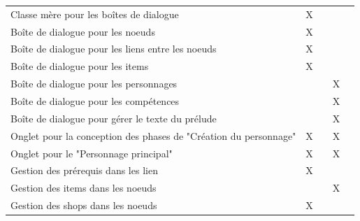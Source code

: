 \begin{centering}
\begin{longtable}{|p{8cm}|c|c|c|c|}
				\rowcolor{lightgray} \multicolumn{5}{|c|}{ \textbf{Boîtes de dialogue}}\\
				\hline
				Classe mère pour les boîtes de dialogue & X & & &\\
				\hline
				Boîte de dialogue pour les noeuds & X & & & \\
				\hline
				Boîte de dialogue pour les liens entre les noeuds & X & & & \\
				\hline
				Boîte de dialogue pour les items & X & & & \\
				\hline
				Boîte de dialogue pour les personnages & & & X & \\
				\hline
				Boîte de dialogue pour les compétences & & & X & \\
				\hline
				Boîte de dialogue pour gérer le texte du prélude & & & X & \\
				\hline
				Onglet pour la conception des phases de "Création du personnage" & X & & X & \\
				\hline
				Onglet pour le "Personnage principal" & X & & X & \\
				\hline
				Gestion des prérequis dans les lien & X & & & \\
				\hline
				Gestion des items dans les noeuds & & & X & \\
				\hline
				Gestion des shops dans les noeuds & X & & & \\
				\hline


\end{longtable}
\end{centering}
